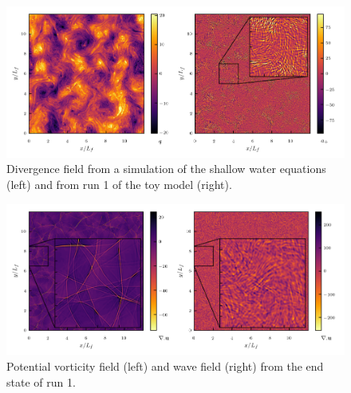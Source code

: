   
\begin{figure}[h]
\centerline{\includegraphics[angle=0]{./fig8.pdf}}
\caption{Divergence field from a simulation of the shallow water equations (left) and from run 1 of the toy model (right). }
\label{Shocks}
 \end{figure}

\begin{figure}[h]
\centerline{\includegraphics[angle=0]{./fig9.pdf}}
\caption{Potential vorticity field (left) and wave field (right) from the end state of run 1.}
\label{Vis1}
\end{figure}

